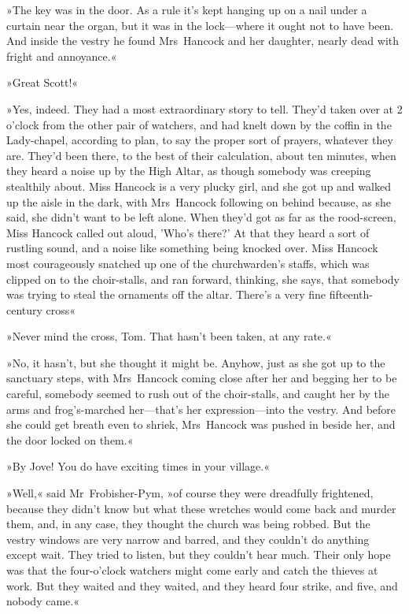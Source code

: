 »The key was in the door. As a rule it's kept hanging up on a nail under a curtain near the organ, but it was in the lock—where it ought not to have been. And inside the vestry he found Mrs~Hancock and her daughter, nearly dead with fright and annoyance.«

»Great Scott!«

»Yes, indeed. They had a most extraordinary story to tell. They'd taken over at 2 o'clock from the other pair of watchers, and had knelt down by the coffin in the Lady-chapel, according to plan, to say the proper sort of prayers, whatever they are. They'd been there, to the best of their calculation, about ten minutes, when they heard a noise up by the High Altar, as though somebody was creeping stealthily about. Miss Hancock is a very plucky girl, and she got up and walked up the aisle in the dark, with Mrs~Hancock following on behind because, as she said, she didn't want to be left alone. When they'd got as far as the rood-screen, Miss Hancock called out aloud, 'Who's there?' At that they heard a sort of rustling sound, and a noise like something being knocked over. Miss Hancock most courageously snatched up one of the churchwarden's staffs, which was clipped on to the choir-stalls, and ran forward, thinking, she says, that somebody was trying to steal the ornaments off the altar. There's a very fine fifteenth-century cross\longdash«

»Never mind the cross, Tom. That hasn't been taken, at any rate.«

»No, it hasn't, but she thought it might be. Anyhow, just as she got up to the sanctuary steps, with Mrs~Hancock coming close after her and begging her to be careful, somebody seemed to rush out of the choir-stalls, and caught her by the arms and frog's-marched her—that's her expression—into the vestry. And before she could get breath even to shriek, Mrs~Hancock was pushed in beside her, and the door locked on them.«

»By Jove! You do have exciting times in your village.«

»Well,« said Mr~Frobisher-Pym, »of course they were dreadfully frightened, because they didn't know but what these wretches would come back and murder them, and, in any case, they thought the church was being robbed. But the vestry windows are very narrow and barred, and they couldn't do anything except wait. They tried to listen, but they couldn't hear much. Their only hope was that the four-o'clock watchers might come early and catch the thieves at work. But they waited and they waited, and they heard four strike, and five, and nobody came.«

